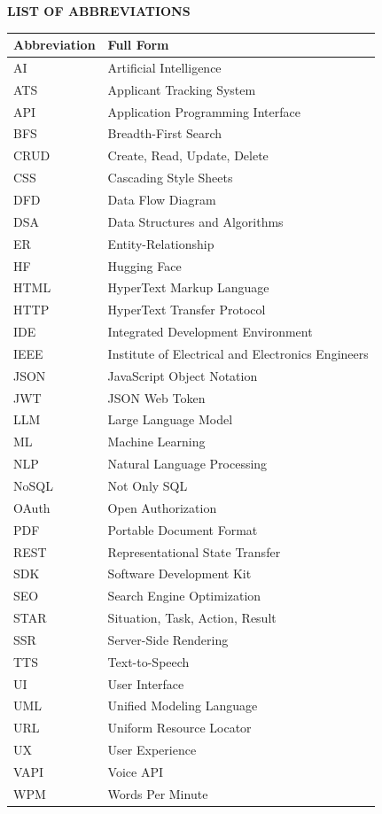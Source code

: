 \documentclass[12pt,a4paper,oneside]{report}
\begin{document}
\newpage
\begin{center}
{\Large\bfseries LIST OF ABBREVIATIONS}
\end{center}
\vspace{1cm}

\begin{longtable}{@{}p{3.5cm} p{10cm}@{}}
\toprule
\textbf{Abbreviation} & \textbf{Full Form} \\
\midrule
\endhead
AI    & Artificial Intelligence \\
ATS   & Applicant Tracking System \\
API   & Application Programming Interface \\
BFS   & Breadth-First Search \\
CRUD  & Create, Read, Update, Delete \\
CSS   & Cascading Style Sheets \\
DFD   & Data Flow Diagram \\
DSA   & Data Structures and Algorithms \\
ER    & Entity-Relationship \\
HF    & Hugging Face \\
HTML  & HyperText Markup Language \\
HTTP  & HyperText Transfer Protocol \\
IDE   & Integrated Development Environment \\
IEEE  & Institute of Electrical and Electronics Engineers \\
JSON  & JavaScript Object Notation \\
JWT   & JSON Web Token \\
LLM   & Large Language Model \\
ML    & Machine Learning \\
NLP   & Natural Language Processing \\
NoSQL & Not Only SQL \\
OAuth & Open Authorization \\
PDF   & Portable Document Format \\
REST  & Representational State Transfer \\
SDK   & Software Development Kit \\
SEO   & Search Engine Optimization \\
STAR  & Situation, Task, Action, Result \\
SSR   & Server-Side Rendering \\
TTS   & Text-to-Speech \\
UI    & User Interface \\
UML   & Unified Modeling Language \\
URL   & Uniform Resource Locator \\
UX    & User Experience \\
VAPI  & Voice API \\
WPM   & Words Per Minute \\
\bottomrule
\end{longtable}
\end{document}
